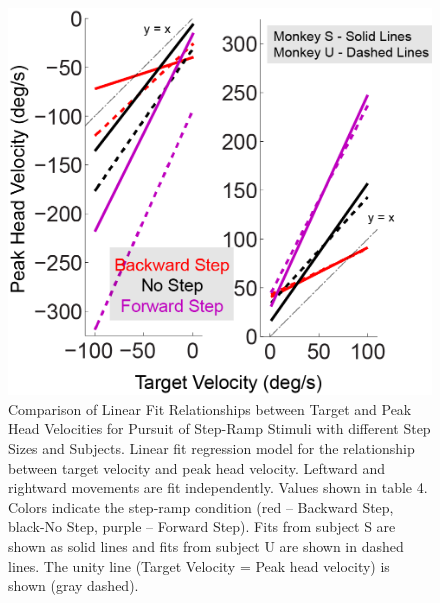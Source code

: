 \documentclass[12pt]{article}
\begin{document}
\begin{figure}
\centering
\includegraphics[width=0.9\linewidth]{./figs/StepRampRegressions}
\caption{Comparison of Linear Fit Relationships between Target and Peak Head Velocities for Pursuit of Step-Ramp Stimuli with different Step Sizes and Subjects. Linear fit regression model for the relationship between target velocity and peak head velocity. Leftward and rightward movements are fit independently. Values shown in table 4. Colors indicate the step-ramp condition (red – Backward Step, black-No Step, purple – Forward Step). Fits from subject S are shown as solid lines and fits from subject U are shown in dashed lines. The unity line (Target Velocity = Peak head velocity) is shown (gray dashed).}
\label{fig:StepRampRegressions}
\end{figure}
\end{document}
